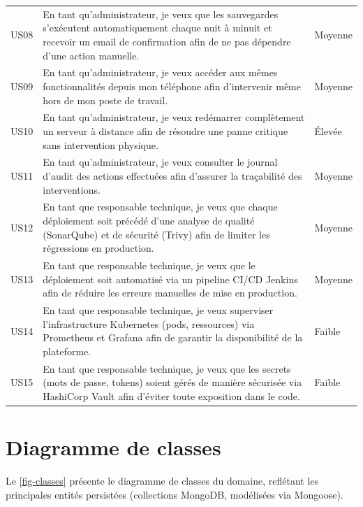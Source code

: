 \begin{center}
\begin{longtable}{@{}p{1.5cm}p{11.3cm}p{2.2cm}@{}}
US08 & En tant qu'administrateur, je veux que les sauvegardes s'exécutent automatiquement chaque nuit à minuit et recevoir un email de confirmation afin de ne pas dépendre d'une action manuelle. & Moyenne \\
US09 & En tant qu'administrateur, je veux accéder aux mêmes fonctionnalités depuis mon téléphone afin d'intervenir même hors de mon poste de travail. & Moyenne \\
US10 & En tant qu'administrateur, je veux redémarrer complètement un serveur à distance afin de résoudre une panne critique sans intervention physique. & Élevée \\
US11 & En tant qu'administrateur, je veux consulter le journal d'audit des actions effectuées afin d'assurer la traçabilité des interventions. & Moyenne \\
US12 & En tant que responsable technique, je veux que chaque déploiement soit précédé d'une analyse de qualité (SonarQube) et de sécurité (Trivy) afin de limiter les régressions en production. & Moyenne \\
US13 & En tant que responsable technique, je veux que le déploiement soit automatisé via un pipeline CI/CD Jenkins afin de réduire les erreurs manuelles de mise en production. & Moyenne \\
US14 & En tant que responsable technique, je veux superviser l'infrastructure Kubernetes (pods, ressources) via Prometheus et Grafana afin de garantir la disponibilité de la plateforme. & Faible \\
US15 & En tant que responsable technique, je veux que les secrets (mots de passe, tokens) soient gérés de manière sécurisée via HashiCorp Vault afin d'éviter toute exposition dans le code. & Faible \\
\end{longtable}
\end{center}

\section{Diagramme de classes}

Le \cref{fig-classes} présente le diagramme de classes du domaine, reflétant les principales entités persistées (collections MongoDB, modélisées via Mongoose).

